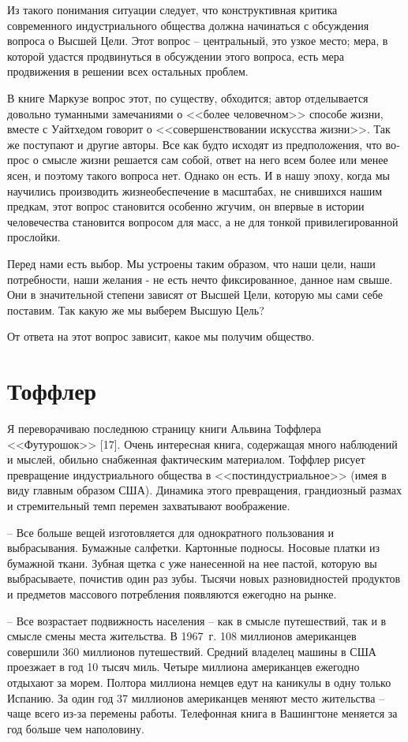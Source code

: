 \documentclass{book}
\begin{document}
{Из такого понимания ситуации следует, что конструктивная критика современного индустриального общества должна на­чинаться с обсуждения вопроса о Высшей Цели. Этот вопрос -- центральный, это узкое место; мера, в которой удастся продви­нуться в обсуждении этого вопроса, есть мера продвижения в решении всех остальных проблем.

В книге Маркузе вопрос этот, по существу, обходится; ав­тор отделывается довольно туманными замечаниями о <<более человечном>> способе жизни, вместе с Уайтхедом говорит о <<со­вершенствовании искусства жизни>>. Так же поступают и другие авторы. Все как будто исходят из предположения, что во­прос о смысле жизни решается сам собой, ответ на него всем более или менее ясен, и поэтому такого вопроса нет. Однако он есть. И в нашу эпоху, когда мы научились производить жизнеобеспечение в масштабах, не снившихся нашим предкам, этот вопрос становится особенно жгучим, он впервые в исто­рии человечества становится вопросом для масс,  а не для тонкой привилегированной прослойки.

Перед нами есть выбор. Мы устроены таким образом, что наши цели, наши потребности, наши желания - не есть нечто фиксированное, данное нам свыше. Они в значительной степе­ни зависят от Высшей Цели, которую мы сами себе поставим. Так какую же мы выберем Высшую Цель?

От ответа на этот вопрос зависит, какое мы получим общество.


\section{Тоффлер}

Я переворачиваю последнюю страницу книги Альвина Тоффлера <<Футурошок>> [17]. Очень интересная книга, содержащая много наблюдений и мыслей, обильно снабженная фактическим материалом. Тоффлер рисует превращение индустриального общества в <<постиндустриальное>> (имея в виду главным образом США). Динамика этого превращения, грандиозный размах и стремительный темп перемен захватывают воображение.

-- Все больше вещей изготовляется для однократного пользования и выбрасывания. Бумажные салфетки. Картонные подносы. Носовые платки из бумажной ткани. Зубная щетка с уже нанесенной на нее пастой, которую вы выбрасываете, почистив один раз зубы. Тысячи новых разновидностей продуктов и предметов массового потребления появляются ежегодно на рынке.

-- Все возрастает подвижность населения -- как в смысле путешествий, так и в смысле смены места жительства. В 1967~г. 108 миллионов американцев совершили 360 миллионов путешествий. Средний владелец машины в США проезжает в год 10 тысяч миль. Четыре миллиона американцев ежегодно отдыхают за морем. Полтора миллиона немцев едут на каникулы в одну только Испанию. За один год 37 миллионов американцев меняют место жительства -- чаще всего из-за перемены работы. Телефонная книга в Вашингтоне меняется за год больше чем наполовину.

}
\end{document}
